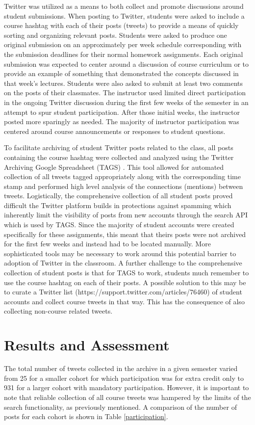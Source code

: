 \documentclass[12pt]{article}
\begin{document}
Twitter was utilized as a means to both collect and promote discussions around student submissions. When posting to Twitter, students were asked to include a course hashtag with each of their posts (tweets) to provide a means of quickly sorting and organizing relevant posts. Students were asked to produce one original submission on an approximately per week schedule corresponding with the submission deadlines for their normal homework assignments. Each original submission was expected to center around a discussion of course curriculum or to provide an example of something that demonstrated the concepts discussed in that week's lectures. Students were also asked to submit at least two comments on the posts of their classmates. The instructor used limited direct participation in the ongoing Twitter discussion during the first few weeks of the semester in an attempt to spur student participation. After those initial weeks, the instructor posted more sparingly as needed. The majority of instructor participation was centered around course announcements or responses to student questions.

To facilitate archiving of student Twitter posts related to the class, all posts containing the course hashtag were collected and analyzed using the Twitter Archiving Google Spreadsheet (TAGS) \cite{hawksey_twitter_2014}. This tool allowed for automated collection of all tweets tagged appropriately along with the corresponding time stamp and performed high level analysis of the connections (mentions) between tweets. Logistically, the comprehensive collection of all student posts proved difficult the Twitter platform builds in protections against spamming which inherently limit the visibility of posts from new accounts through the search API which is used by TAGS. Since the majority of student accounts were created specifically for these assignments, this meant that theirs posts were not archived for the first few weeks and instead had to be located manually. More sophisticated tools may be necessary to work around this potential barrier to adoption of Twitter in the classroom. A further challenge to the comprehensive collection of student posts is that for TAGS to work, students much remember to use the course hashtag on each of their posts. A possible solution to this may be to curate a Twitter list (https://support.twitter.com/articles/76460) of student accounts and collect course tweets in that way. This has the consequence of also collecting non-course related tweets.

\section*{Results and Assessment}
The total number of tweets collected in the archive in a given semester varied from 25 for a smaller cohort for which participation was for extra credit only to 931 for a larger cohort with mandatory participation. However, it is important to note that reliable collection of all course tweets was hampered by the limits of the search functionality, as previously mentioned. A comparison of the number of posts for each cohort is shown in Table \ref{participation}.
\end{document}
